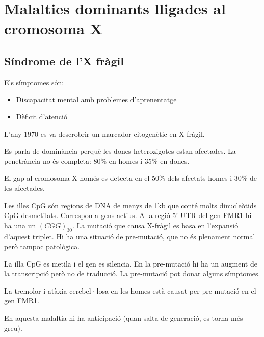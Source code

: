 \section{Malalties dominants lligades al cromosoma X}
\label{sec:malalt-domin-llig}

\subsection{Síndrome de l'X fràgil}
\label{sec:x-fragil}

Els símptomes són:
\begin{itemize}
\item Discapacitat mental amb problemes d'aprenentatge
\item Dèficit d'atenció
\end{itemize}

L'any 1970 es va descrobrir un marcador citogenètic en X-fràgil.

Es parla de dominància perquè les dones heterozigotes estan afectades. La penetrància no és completa: 80\% en homes i 35\% en dones.

El gap al cromosoma X només es detecta en el 50\% dels afectats homes i 30\% de les afectades.

Les illes CpG són regions de DNA de menys de 1kb que conté molts dinucleòtids CpG desmetilats. Correspon a gens actius. A la regió 5'-UTR del gen FMR1 hi ha una un $(CGG)_{30}$. La mutació que causa X-fràgil es basa en l'expansió d'aquest triplet. Hi ha una situació de pre-mutació, que no és plenament normal però tampoc patològica. 

La illa CpG es metila i el gen es silencia. En la pre-mutació hi ha un augment de la transcripció però no de traducció. La pre-mutació pot donar alguns símptomes.

La tremolor i atàxia cerebel·losa en les homes està causat per pre-mutació en el gen FMR1. 

En aquesta malaltia hi ha anticipació (quan salta de generació, es torna més greu).